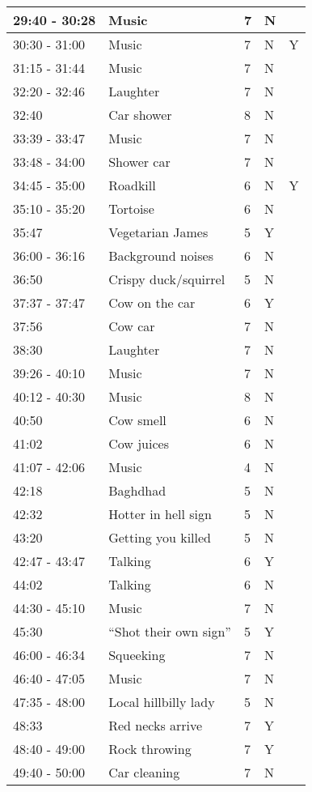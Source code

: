 \begin{longtable}{| p{70pt} | p{130pt} | p{45pt} | p{57pt} | p{60pt}|}
29:40 - 30:28 & Music & 7 & N&\\\hline
30:30 - 31:00 & Music & 7 & N&Y\\\hline
31:15 - 31:44 & Music & 7 & N&\\\hline
32:20 - 32:46 & Laughter & 7 & N&\\\hline
32:40 & Car shower & 8 & N&\\\hline
33:39 - 33:47 & Music & 7 & N&\\\hline
33:48 - 34:00 & Shower car & 7 & N&\\\hline
34:45 - 35:00 & Roadkill & 6 & N&Y\\\hline
35:10 - 35:20 & Tortoise & 6 & N&\\\hline
35:47 & Vegetarian James & 5 & Y&\\\hline
36:00 - 36:16 & Background noises & 6 & N&\\\hline
36:50 & Crispy duck/squirrel & 5 & N&\\\hline
37:37 - 37:47 & Cow on the car & 6 & Y&\\\hline
37:56 & Cow car & 7 & N&\\\hline
38:30 & Laughter & 7 & N&\\\hline
39:26 - 40:10 & Music & 7 & N&\\\hline
40:12 - 40:30 & Music & 8 & N&\\\hline
40:50 & Cow smell & 6 & N&\\\hline
41:02 & Cow juices & 6 & N&\\\hline
41:07 - 42:06 & Music & 4 & N&\\\hline
42:18 & Baghdhad & 5 & N&\\\hline
42:32 & Hotter in hell sign & 5 & N&\\\hline
43:20 & Getting you killed & 5 & N&\\\hline
42:47 - 43:47 & Talking & 6 & Y&\\\hline
44:02 & Talking & 6 & N&\\\hline
44:30 - 45:10 & Music & 7 & N&\\\hline
45:30 & ``Shot their own sign'' & 5 & Y&\\\hline
46:00 - 46:34 & Squeeking & 7 & N&\\\hline
46:40 - 47:05 & Music & 7 & N&\\\hline
47:35 - 48:00 & Local hillbilly lady & 5 & N&\\\hline
48:33 & Red necks arrive & 7 & Y&\\\hline
48:40 - 49:00 & Rock throwing & 7 & Y&\\\hline
49:40 - 50:00 & Car cleaning & 7 & N&\\\hline

\end{longtable}

